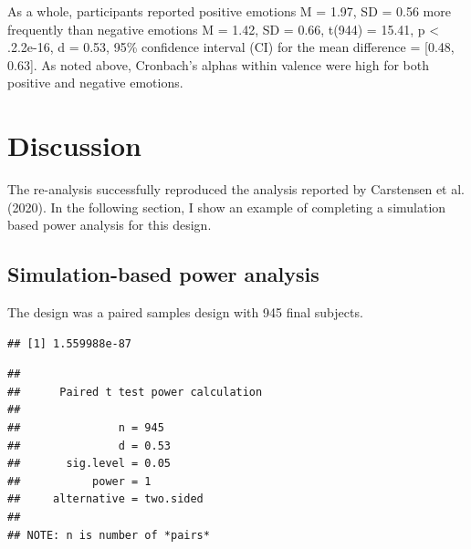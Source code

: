 \documentclass[
  english,
  man]{apa6}
\begin{document}
As a whole, participants reported positive emotions M = 1.97, SD = 0.56 more frequently than negative emotions M = 1.42, SD = 0.66, t(944) = 15.41, p \textless{} .2.2e-16, d = 0.53, 95\% confidence interval (CI) for the mean difference = {[}0.48, 0.63{]}. As noted above, Cronbach's alphas within valence were high for both positive and negative emotions.

\hypertarget{discussion}{%
\section{Discussion}\label{discussion}}

The re-analysis successfully reproduced the analysis reported by Carstensen et al. (2020). In the following section, I show an example of completing a simulation based power analysis for this design.

\hypertarget{simulation-based-power-analysis}{%
\subsection{Simulation-based power analysis}\label{simulation-based-power-analysis}}

The design was a paired samples design with 945 final subjects.

\begin{verbatim}
## [1] 1.559988e-87
\end{verbatim}

\begin{verbatim}
## 
##      Paired t test power calculation 
## 
##               n = 945
##               d = 0.53
##       sig.level = 0.05
##           power = 1
##     alternative = two.sided
## 
## NOTE: n is number of *pairs*
\end{verbatim}
\end{document}
